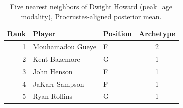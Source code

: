 \begin{table}[htbp]
  \centering\small
  \begin{tabular}{rllc}
    \toprule
    Rank & Player & Position & Archetype \\
    \midrule
    1 & Mouhamadou Gueye & F & 2 \\
    2 & Kent Bazemore & G & 1 \\
    3 & John Henson & F & 1 \\
    4 & JaKarr Sampson & F & 1 \\
    5 & Ryan Rollins & G & 1 \\
    \bottomrule
  \end{tabular}
  \caption{Five nearest neighbors of Dwight Howard (peak_age modality), Procrustes-aligned posterior mean.}
  \label{tab:Dwight_Howard_neighbors_peak_age}
\end{table}

